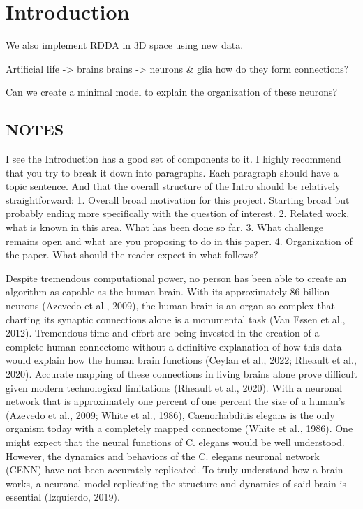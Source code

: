 \section{Introduction}

We also implement RDDA in 3D space using new data.

Artificial life -> brains
brains -> neurons \& glia 
how do they form connections?

Can we create a minimal model to explain the organization of these neurons?


\subsection{NOTES}
I see the Introduction has a good set of components to it. I highly recommend that you try to break it down into paragraphs. Each paragraph should have a topic sentence. And that the overall structure of the Intro should be relatively straightforward:
1. Overall broad motivation for this project. Starting broad but probably ending more specifically with the question of interest. 
2. Related work, what is known in this area. What has been done so far. 
3. What challenge remains open and what are you proposing to do in this paper. 
4. Organization of the paper. What should the reader expect in what follows? 

Despite tremendous computational power, no person has been able to create an algorithm as capable as the human brain. With its approximately 86 billion neurons (Azevedo et al., 2009), the human brain is an organ so complex that charting its synaptic connections alone is a monumental task (Van Essen et al., 2012). Tremendous time and effort are being invested in the creation of a complete human connectome without a definitive explanation of how this data would explain how the human brain functions (Ceylan et al., 2022; Rheault et al., 2020). Accurate mapping of these connections in living brains alone prove difficult given modern technological limitations (Rheault et al., 2020). With a neuronal network that is approximately one percent of one percent the size of a human’s (Azevedo et al., 2009; White et al., 1986), Caenorhabditis elegans is the only organism today with a completely mapped connectome (White et al., 1986). One might expect that the neural functions of C. elegans would be well understood. However, the dynamics and behaviors of the C. elegans neuronal network (CENN) have not been accurately replicated. To truly understand how a brain works, a neuronal model replicating the structure and dynamics of said brain is essential (Izquierdo, 2019).

